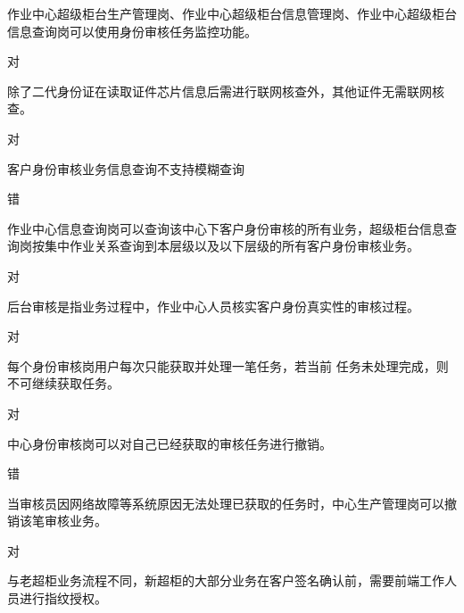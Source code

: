 \documentclass[kindlepaper]{BHCexam4kindle}
\begin{document}
\begin{questions}
\qs 作业中心超级柜台生产管理岗、作业中心超级柜台信息管理岗、作业中心超级柜台信息查询岗可以使用身份审核任务监控功能。 \xx
\begin{solution} 对 \end{solution}
\qs 除了二代身份证在读取证件芯片信息后需进行联网核查外，其他证件无需联网核查。 \xx
\begin{solution} 对 \end{solution}
\qs 客户身份审核业务信息查询不支持模糊查询 \xx
\begin{solution} 错 \end{solution}
\qs 作业中心信息查询岗可以查询该中心下客户身份审核的所有业务，超级柜台信息查询岗按集中作业关系查询到本层级以及以下层级的所有客户身份审核业务。 \xx
\begin{solution} 对 \end{solution}
\qs 后台审核是指业务过程中，作业中心人员核实客户身份真实性的审核过程。 \xx
\begin{solution} 对 \end{solution}
\qs 每个身份审核岗用户每次只能获取并处理一笔任务，若当前
任务未处理完成，则不可继续获取任务。 \xx
\begin{solution} 对 \end{solution}
\qs 中心身份审核岗可以对自己已经获取的审核任务进行撤销。 \xx
\begin{solution} 错 \end{solution}
\qs 当审核员因网络故障等系统原因无法处理已获取的任务时，中心生产管理岗可以撤销该笔审核业务。 \xx
\begin{solution} 对 \end{solution}
\qs 与老超柜业务流程不同，新超柜的大部分业务在客户签名确认前，需要前端工作人员进行指纹授权。 \xx

\end{questions}
\end{document}
